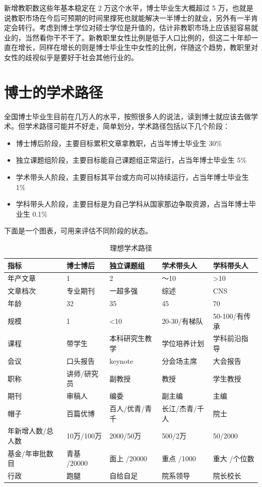 \documentclass[]{tufte-book}
\begin{document}
新增教职数这些年基本稳定在 2 万这个水平，博士毕业生大概超过 5 万，也就是说教职市场在今后可预期的时间里撑死也就能解决一半博士的就业，另外有一半肯定会转行。考虑到博士学位对硕士学位是升值的，估计非教职市场上应该挺容易就业的，当然看你干不干了。新教职里女性比例是低于人口比例的，但这二十年却一直在增长，同样在增长的则是博士毕业生中女性的比例，伴随这个趋势，教职里对女性的歧视似乎是要好于社会其他行业的。

\hypertarget{ux535aux58ebux7684ux5b66ux672fux8defux5f84}{%
\section{博士的学术路径}\label{ux535aux58ebux7684ux5b66ux672fux8defux5f84}}

全国博士毕业生目前在几万人的水平，按照很多人的说法，读到博士就应该去做学术。但学术路径可能并不好走，简单划分，学术路径包括以下几个阶段：

\begin{itemize}
\item
  博士博后阶段，主要目标累积文章拿教职，占当年博士毕业生 30\%
\item
  独立课题组阶段，主要目标能自己课题组正常运行，占当年博士毕业生 5\%
\item
  学术带头人阶段，主要目标其平台或方向可以持续运行，占当年博士毕业生 1\%
\item
  学科带头人阶段，主要目标是为自己学科从国家那边争取资源，占当年博士毕业生 0.1\%
\end{itemize}

下面是一个图表，可用来评估不同阶段的状态。

\begin{longtable}[t]{lllll}
\caption{\label{tab:unnamed-chunk-1}理想学术路径}\\
\toprule
指标 & 博士博后 & 独立课题组 & 学术带头人 & 学科带头人\\
\midrule
年产文章 & 1 & 2 & ～10 & >10\\
文章档次 & 专业期刊 & 一超多强 & 综述 & CNS\\
年龄 & 32 & 35 & 45 & 70\\
规模 & 1 & <10 & 20-30/有梯队 & 50-100/有传承\\
课程 & 带学生 & 本科研究生教学 & 学位培养计划 & 学科前沿指导\\
\addlinespace
会议 & 口头报告 & keynote & 分会场主席 & 大会报告\\
职称 & 讲师/研究员 & 副教授 & 教授 & 学生教授\\
期刊 & 审稿人 & 编委 & 副主编 & 主编\\
帽子 & 百篇优博 & 百人/优青/青千 & 长江/杰青/千人 & 院士\\
年新增人数/总人数 & 10万/100万 & 2000/50万 & 500/2万 & 50/2000\\
\addlinespace
基金/年审批数目 & 青基 /20000 & 面上 /20000 & 重点 /1000 & 重大 /个位数\\
行政 & 跑腿 & 自给自足 & 院系领导 & 院长校长\\
\bottomrule
\end{longtable}
\end{document}
